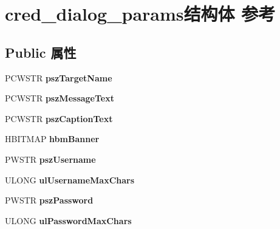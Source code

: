 \hypertarget{structcred__dialog__params}{}\section{cred\+\_\+dialog\+\_\+params结构体 参考}
\label{structcred__dialog__params}
\subsection*{Public 属性}
\begin{DoxyCompactItemize}
\item 
\mbox{\label{structcred__dialog__params_a6f376ddc7ceada5a72c9883e43458a0a}} 
P\+C\+W\+S\+TR {\bfseries psz\+Target\+Name}
\item 
\mbox{\label{structcred__dialog__params_aba272a3564384682d2e26429edcb8820}} 
P\+C\+W\+S\+TR {\bfseries psz\+Message\+Text}
\item 
\mbox{\label{structcred__dialog__params_a5745444b2d6252f04a582e509563551b}} 
P\+C\+W\+S\+TR {\bfseries psz\+Caption\+Text}
\item 
\mbox{\label{structcred__dialog__params_a085625ee4da80f38f85d51134a28df76}} 
H\+B\+I\+T\+M\+AP {\bfseries hbm\+Banner}
\item 
\mbox{\label{structcred__dialog__params_a3783b0ddf92110dc928718fd40388a33}} 
P\+W\+S\+TR {\bfseries psz\+Username}
\item 
\mbox{\label{structcred__dialog__params_a9b63bbc5dacab72ef4c01550b666fd9c}} 
U\+L\+O\+NG {\bfseries ul\+Username\+Max\+Chars}
\item 
\mbox{\label{structcred__dialog__params_a14629b0345d2335be8fa63976e2a6f6d}} 
P\+W\+S\+TR {\bfseries psz\+Password}
\item 
\mbox{\label{structcred__dialog__params_a0c5691259bde0e2b64e42e9adaec5b19}} 
U\+L\+O\+NG {\bfseries ul\+Password\+Max\+Chars}
\item 
\mbox{\label{structcred__dialog__params_ab9ef93419ae7e97f2b2a812360d7a62d}} 

\end{DoxyCompactItemize}
